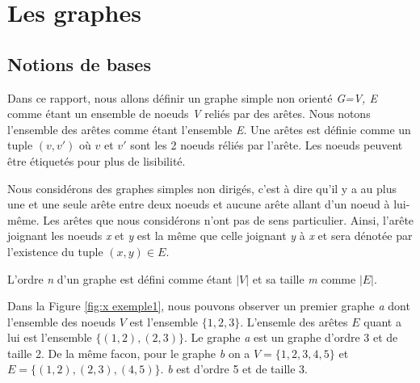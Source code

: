 \documentclass[12pt,a4paper]{article}
\begin{document}
\section{Les graphes}%
\label{sec:graphes}

\subsection{Notions de bases}

Dans ce rapport, nous allons définir un graphe simple non orienté \emph{G=V, E} comme étant un ensemble de noeuds \emph{V} reliés par des arêtes. Nous notons l'ensemble des arêtes comme étant l'ensemble \emph{E}. Une arêtes est définie comme un tuple $ (v, v') $ où $ v $ et $ v' $ sont les 2 noeuds réliés par l'arête. Les noeuds peuvent être étiquetés pour plus de lisibilité.


Nous considérons des graphes simples non dirigés, c'est à dire qu'il y a au plus une et une seule arête entre deux noeuds et aucune arête allant d'un noeud à lui-même. Les arêtes que nous considérons n'ont pas de sens particulier. Ainsi, l'arête joignant les noeuds \emph{x} et \emph{y} est la même que celle joignant \emph{y} à \emph{x} et sera dénotée par l'existence du tuple $(x, y) \in E$.

L'ordre \emph{n} d'un graphe est défini comme étant $ |V| $ et sa taille \emph{m} comme $ |E| $.

Dans la Figure \ref{fig:x exemple1}, nous pouvons observer un premier graphe \textit{a} dont l'ensemble des noeuds \(V\) est l'ensemble \(\{1, 2, 3\}\). L'ensemle des arêtes \(E\) quant a lui est l'ensemble \(\{(1,2), (2,3)\}\). Le graphe \textit{a} est un graphe d'ordre 3 et de taille 2. De la même facon, pour le graphe \textit{b} on a \(V = \{1, 2, 3, 4, 5\}\) et \(E = \{(1,2), (2,3), (4,5)\}\). \textit{b} est d'ordre 5 et de taille 3.
\end{document}
